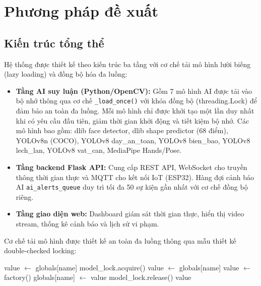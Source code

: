 \section{Phương pháp đề xuất}

\subsection{Kiến trúc tổng thể}

Hệ thống được thiết kế theo kiến trúc ba tầng với cơ chế tải mô hình lười biếng (lazy loading) và đồng bộ hóa đa luồng:

\begin{itemize}[leftmargin=*,nosep]
  \item \textbf{Tầng AI suy luận (Python/OpenCV):} Gồm 7 mô hình AI được tải vào bộ nhớ thông qua cơ chế {\tt \_load\_once()} với khóa đồng bộ (threading.Lock) để đảm bảo an toàn đa luồng. Mỗi mô hình chỉ được khởi tạo một lần duy nhất khi có yêu cầu đầu tiên, giảm thời gian khởi động và tiết kiệm bộ nhớ. Các mô hình bao gồm: dlib face detector, dlib shape predictor (68 điểm), YOLOv8n (COCO), YOLOv8 day\_an\_toan, YOLOv8 bien\_bao, YOLOv8 lech\_lan, YOLOv8 vat\_can, MediaPipe Hands/Pose.
  \item \textbf{Tầng backend Flask API:} Cung cấp REST API, WebSocket cho truyền thông thời gian thực và MQTT cho kết nối IoT (ESP32). Hàng đợi cảnh báo AI {\tt ai\_alerts\_queue} duy trì tối đa 50 sự kiện gần nhất với cơ chế đồng bộ riêng.
  \item \textbf{Tầng giao diện web:} Dashboard giám sát thời gian thực, hiển thị video stream, thống kê cảnh báo và lịch sử vi phạm.
\end{itemize}

Cơ chế tải mô hình được thiết kế an toàn đa luồng thông qua mẫu thiết kế double-checked locking:

\begin{algorithm}[!ht]
\caption{Cơ chế tải mô hình lười biếng an toàn đa luồng}
\fontsize{8}{10}\selectfont
\begin{algorithmic}[1]
    \State value $\gets$ globals[name]
        \State model\_lock.acquire()
        \State value $\gets$ globals[name]
            \State value $\gets$ factory()
            \State globals[name] $\gets$ value
        \EndIf
        \State model\_lock.release()
    \EndIf
    \State \Return value
\EndProcedure
\end{algorithmic}
\end{algorithm}

